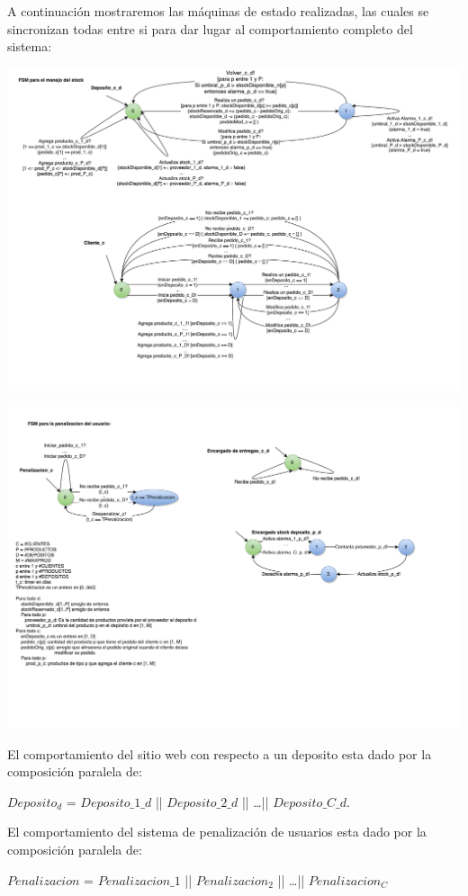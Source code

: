 A continuación mostraremos las máquinas de estado realizadas, las cuales se sincronizan todas entre si para dar lugar al comportamiento completo del sistema:

\includegraphics[scale=0.5, angle=90]{secciones/FSM}

\newpage

\includegraphics[scale=0.5, angle=90]{secciones/FSM2}

\newpage

El comportamiento del sitio web con respecto a un deposito esta dado por la composición paralela de:
\begin{center}
$Deposito_d$ = $Deposito\_1\_d$ || $Deposito\_2\_d$ || \ldots || $Deposito\_C\_d$.
\end{center}

El comportamiento del sistema de penalización de usuarios esta dado por la composición paralela de:
\begin{center}
$Penalizacion$ = $Penalizacion\_1$ || $Penalizacion_2$ || \ldots || $Penalizacion_C$
\end{center}

